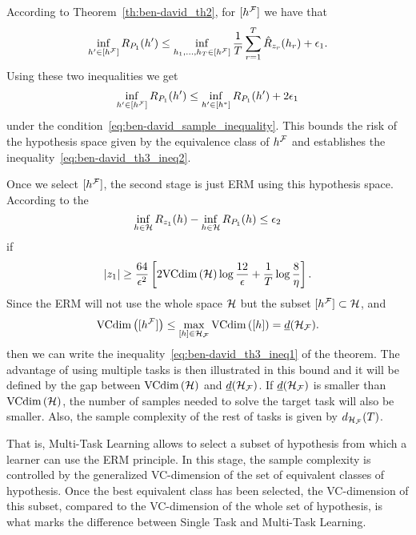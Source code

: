 According to Theorem~\ref{th:ben-david_th2}, for $\lbrack h^{\mathcal{F}}\rbrack$ we have that
\begin{equation}
    \nonumber
    {\inf_{h' \in \lbrack h^{\mathcal{F}}\rbrack}R_{P_1}(h')} \leq \inf_{h_1, \ldots, h_T \in \lbrack h^{\mathcal{F}}\rbrack} \frac{1}{T} \sum_{r=1}^T \hat{R}_{z_r}(h_r)  + \epsilon_1.
\end{equation}
Using these two inequalities we get
\begin{equation}
    \nonumber
    \inf_{h' \in \lbrack h^{\mathcal{F}}\rbrack}R_{P_1}(h') \leq \inf_{h' \in \lbrack h^*\rbrack}R_{P_1}(h') + 2\epsilon_1 
\end{equation}
under the condition~\eqref{eq:ben-david_sample_inequality}. This bounds the risk of the hypothesis space given by the equivalence class of $h^{\mathcal{F}}$ and establishes the inequality~\eqref{eq:ben-david_th3_ineq2}.
%

Once we select $\lbrack h^{\mathcal{F}}\rbrack$, the second stage is just ERM using this hypothesis space.
%
According to the 
\begin{equation}\nonumber
    \inf_{h \in \mathcal{H}} R_{z_1}(h) - \inf_{h \in \mathcal{H}} R_{P_1}(h) \leq \epsilon_2
\end{equation}
if
\begin{equation}
    \nonumber
    \left|z_1\right| \geq  \frac{64}{\epsilon^2} \left[2 \text{VCdim}\left(\mathcal{H}\right) \log \frac{12}{\epsilon} + \frac{1}{T}\log\frac{8}{\eta} \right] .
\end{equation}
Since the ERM will not use the whole space $\mathcal{H}$ but the subset $\lbrack h^{\mathcal{F}}\rbrack \subset \mathcal{H}$, and
$$\text{VCdim}\left(\lbrack h^{\mathcal{F}}\rbrack\right) \leq \max_{\lbrack h\rbrack \in \mathcal{H}_{\mathcal{F}}} \text{VCdim}\left(\lbrack h\rbrack\right) = \underline{d}(\mathcal{H}_{\mathcal{F}}).$$
 then we can write the inequality~\eqref{eq:ben-david_th3_ineq1} of the theorem.
%
The advantage of using multiple tasks is then illustrated in this bound and it will be defined by the gap between $\text{VCdim}\left(\mathcal{H}\right)$ and $\underline{d}(\mathcal{H}_{\mathcal{F}})$. If $\underline{d}(\mathcal{H}_{\mathcal{F}})$ is smaller than $\text{VCdim}\left(\mathcal{H}\right)$, the number of samples needed to solve the target task will also be smaller.
Also, the sample complexity of the rest of tasks is given by $d_{\mathcal{H}_{\mathcal{F}}}(T)$.

That is, Multi-Task Learning allows to select a subset of hypothesis from which a learner can use the ERM principle. In this stage, the sample complexity is controlled by the generalized VC-dimension of the set of equivalent classes of hypothesis. Once the best equivalent class has been selected, 
the VC-dimension of this subset, compared to the VC-dimension of the whole set of hypothesis, is what marks the difference between Single Task and Multi-Task Learning.

